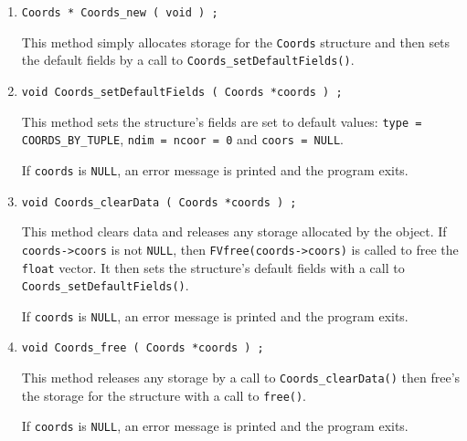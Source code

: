 \begin{enumerate}
\item
\begin{verbatim}
Coords * Coords_new ( void ) ;
\end{verbatim}
This method simply allocates storage for the {\tt Coords} structure 
and then sets the default fields by a call to 
{\tt Coords\_setDefaultFields()}.
\item
\begin{verbatim}
void Coords_setDefaultFields ( Coords *coords ) ;
\end{verbatim}
This method sets the structure's fields are set to default values:
{\tt type = COORDS\_BY\_TUPLE}, 
{\tt ndim = ncoor = 0} and {\tt coors = NULL}.
\par {}
If {\tt coords} is {\tt NULL},
an error message is printed and the program exits.
\item
\begin{verbatim}
void Coords_clearData ( Coords *coords ) ;
\end{verbatim}
This method clears data and releases any storage allocated by the
object.
If {\tt coords->coors} is not {\tt NULL}, 
then {\tt FVfree(coords->coors)} is called to free the {\tt float}
vector.
It then sets the structure's default fields 
with a call to {\tt Coords\_setDefaultFields()}.
\par {}
If {\tt coords} is {\tt NULL},
an error message is printed and the program exits.
\item
\begin{verbatim}
void Coords_free ( Coords *coords ) ;
\end{verbatim}
This method releases any storage by a call to 
{\tt Coords\_clearData()} then free's the storage for the 
structure with a call to {\tt free()}.
\par {}
If {\tt coords} is {\tt NULL},
an error message is printed and the program exits.
\end{enumerate}
\par
